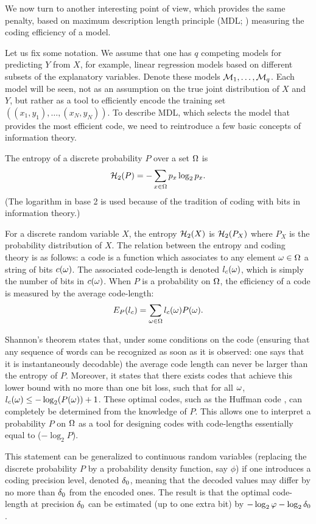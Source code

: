 \bigskip
We now turn to another
interesting point of view, which provides the same penalty, based
on maximum description length principle (MDL; \citet{rissanen1989stochastic})  measuring the coding efficiency of a model.

Let us fix some notation. We assume that one has $q$ competing models
for predicting $Y$ from $X$, for example, linear
regression models based on different subsets of the explanatory
variables. Denote these models ${\mathcal M}_1, \ldots, {\mathcal M}_q$. Each model will
be seen, not as an assumption on the true joint distribution of $X$ and
$Y$, but rather as a tool to efficiently encode the training set
$((x_1, y_1), \ldots, (x_N, y_N))$. To describe MDL, which selects the model that provides the most efficient code, we need to
reintroduce a few basic concepts of information theory.

The entropy of a discrete probability $P$ over a set $\Omega$ is 
$$
{\mathcal H}_2(P) = - \sum_{x\in \Omega} p_x \log_2p_x.
$$
(The logarithm in base 2 is used because of the tradition of coding with
bits in information theory.)

For a discrete random variable $X$, the entropy ${\mathcal H}_2(X)$ is ${\mathcal H}_2(P_X)$
where $P_X$ is the probability distribution of $X$. The relation
between the entropy and coding theory is as follows: a code is a
function which associates to any element $\omega\in \Omega$ a string of bits
$c(\omega)$. The associated code-length is denoted $l_c(\omega)$, which is simply
the number of bits in $c(\omega)$. When $P$ is a probability on $\Omega$,
the efficiency of a code is measured by the average code-length:
$$
E_P(l_c) = \sum_{\omega\in\Omega} l_c(\omega) P(\omega).
$$

Shannon's theorem \citep{shannon1948mathematical, cover2012elements} states that, under some conditions on the code
(ensuring that any sequence of words can be recognized as soon as it is observed: one says that it is instantaneously decodable) the average
code length can never be larger than the entropy of $P$. Moreover, it states that
there exists codes that achieve this lower bound with no more than one
bit loss,  such that for all $\omega$, $l_c(\omega) \leq -
\log_2(P(\omega)) + 1$. These optimal codes, such as the Huffman code \citep{cover2012elements}, can completely be determined from the
knowledge of $P$. This allows one to interpret a probability $P$ on $\Omega$
as a tool for designing codes with code-lengths essentially equal to   ($-\log_2
P$).

This statement can be generalized to continuous random
variables (replacing the discrete probability $P$ by a probability density function, say $\phi$) if one introduces a coding precision level, denoted $\delta_0$, meaning that the decoded values may differ by no more than $\delta_0$ from the encoded ones. The result is that
the optimal code-length at precision $\delta_0$ can be estimated (up to one extra bit) by $- \log_2 \varphi - \log_2\delta_0$. 

